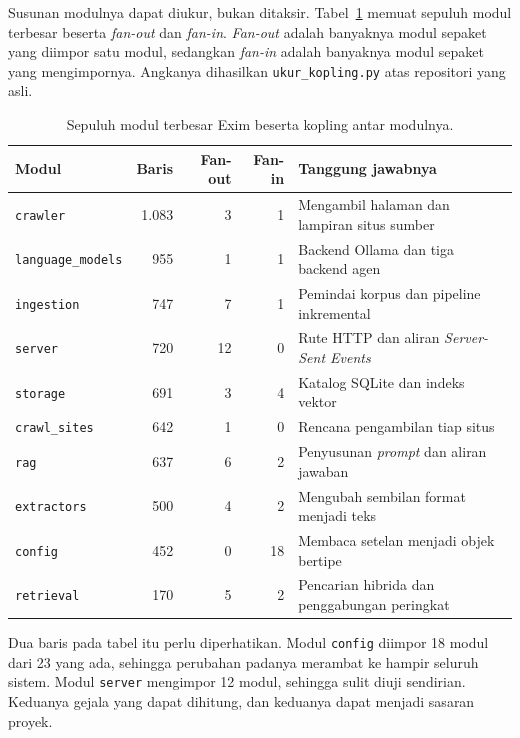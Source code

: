 Susunan modulnya dapat diukur, bukan ditaksir. Tabel~\ref{tab:exim-modul}
memuat sepuluh modul terbesar beserta \textit{fan-out} dan \textit{fan-in}.
\textit{Fan-out} adalah banyaknya modul sepaket yang diimpor satu modul,
sedangkan \textit{fan-in} adalah banyaknya modul sepaket yang mengimpornya.
Angkanya dihasilkan \texttt{ukur\_kopling.py} atas repositori yang asli.

\begin{table}[htbp]
  \centering
  \caption{Sepuluh modul terbesar Exim beserta kopling antar modulnya.}
  \label{tab:exim-modul}
  \begin{tabularx}{\textwidth}{|l|r|r|r|X|}
    \hline
    \textbf{Modul} & \textbf{Baris} & \textbf{Fan-out} & \textbf{Fan-in} & \textbf{Tanggung jawabnya} \\
    \hline
    \texttt{crawler} & 1.083 & 3 & 1 & Mengambil halaman dan lampiran situs sumber \\
    \hline
    \texttt{language\_models} & 955 & 1 & 1 & Backend Ollama dan tiga backend agen \\
    \hline
    \texttt{ingestion} & 747 & 7 & 1 & Pemindai korpus dan pipeline inkremental \\
    \hline
    \texttt{server} & 720 & 12 & 0 & Rute HTTP dan aliran \textit{Server-Sent Events} \\
    \hline
    \texttt{storage} & 691 & 3 & 4 & Katalog SQLite dan indeks vektor \\
    \hline
    \texttt{crawl\_sites} & 642 & 1 & 0 & Rencana pengambilan tiap situs \\
    \hline
    \texttt{rag} & 637 & 6 & 2 & Penyusunan \textit{prompt} dan aliran jawaban \\
    \hline
    \texttt{extractors} & 500 & 4 & 2 & Mengubah sembilan format menjadi teks \\
    \hline
    \texttt{config} & 452 & 0 & 18 & Membaca setelan menjadi objek bertipe \\
    \hline
    \texttt{retrieval} & 170 & 5 & 2 & Pencarian hibrida dan penggabungan peringkat \\
    \hline
  \end{tabularx}
\end{table}

Dua baris pada tabel itu perlu diperhatikan. Modul \texttt{config} diimpor 18
modul dari 23 yang ada, sehingga perubahan padanya merambat ke hampir seluruh
sistem. Modul \texttt{server} mengimpor 12 modul, sehingga sulit diuji
sendirian. Keduanya gejala yang dapat dihitung, dan keduanya dapat menjadi
sasaran proyek.

